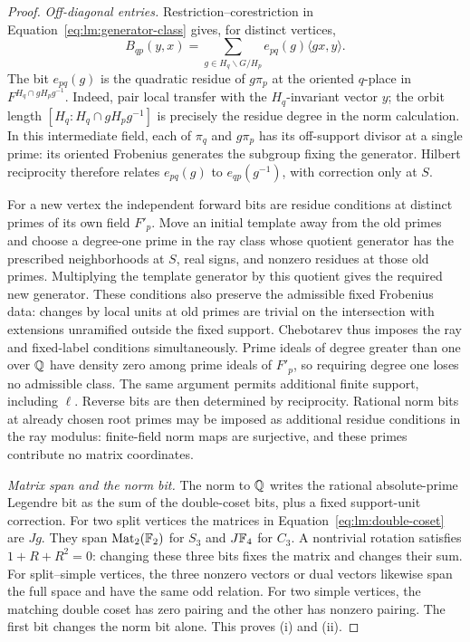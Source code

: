 \begin{proof}
\emph{Off-diagonal entries.}
Restriction--corestriction in Equation~\eqref{eq:lm:generator-class}
gives, for distinct vertices,
\begin{equation}\label{eq:lm:double-coset}
 B_{qp}(y,x)=
 \sum_{g\in H_q\backslash G/H_p}
 e_{pq}(g)\langle gx,y\rangle.
\end{equation}
The bit $e_{pq}(g)$ is the quadratic residue of $g\pi_p$ at the
oriented $q$-place in $F^{H_q\cap gH_pg^{-1}}$. Indeed, pair local
transfer with the $H_q$-invariant vector $y$; the orbit length
$[H_q:H_q\cap gH_pg^{-1}]$ is precisely the residue degree in the
norm calculation. In this intermediate field, each of $\pi_q$ and
$g\pi_p$ has its off-support divisor at a single prime: its oriented
Frobenius generates the subgroup fixing the generator. Hilbert
reciprocity therefore relates $e_{pq}(g)$ to $e_{qp}(g^{-1})$, with
correction only at $S$.

For a new vertex the independent forward bits are residue conditions
at distinct primes of its own field $F'_p$. Move an initial template
away from the old primes and choose a degree-one prime in the ray class
whose quotient generator has the prescribed neighborhoods at $S$,
real signs, and nonzero residues at those old primes. Multiplying the
template generator by this quotient gives the required new generator.
These conditions also preserve the admissible fixed Frobenius data:
changes by local units at old primes are trivial on the intersection
with extensions unramified outside the fixed support. Chebotarev thus
imposes the ray and fixed-label conditions simultaneously. Prime ideals
of degree greater than one over $\mathbb Q$ have density zero among prime
ideals of $F'_p$, so requiring degree one loses no admissible class.
The same argument permits additional finite support, including $\ell$.
Reverse bits are then determined by reciprocity. Rational norm bits at
already chosen root primes may be imposed as additional residue
conditions in the ray modulus: finite-field norm maps are surjective,
and these primes contribute no matrix coordinates.

\emph{Matrix span and the norm bit.}
The norm to $\mathbb Q$ writes the rational absolute-prime Legendre bit as
the sum of the double-coset bits, plus a fixed support-unit correction.
For two split vertices the matrices in
Equation~\eqref{eq:lm:double-coset} are $Jg$. They span
$\operatorname{Mat}_2(\mathbb F_2)$ for $S_3$ and $J\mathbb F_4$ for $C_3$.
A nontrivial rotation satisfies $1+R+R^2=0$: changing these three
bits fixes the matrix and changes their sum. For split--simple
vertices, the three nonzero vectors or dual vectors likewise span
the full space and have the same odd relation. For two simple vertices,
the matching double coset has zero pairing and the other has nonzero
pairing. The first bit changes the norm bit alone. This proves
\textup{(i)} and \textup{(ii)}.


\end{proof}
